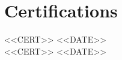 \section{Certifications}
<<CERT>> \hfill {\small\color{rulegray}<<DATE>>}\\
<<CERT>> \hfill {\small\color{rulegray}<<DATE>>}



